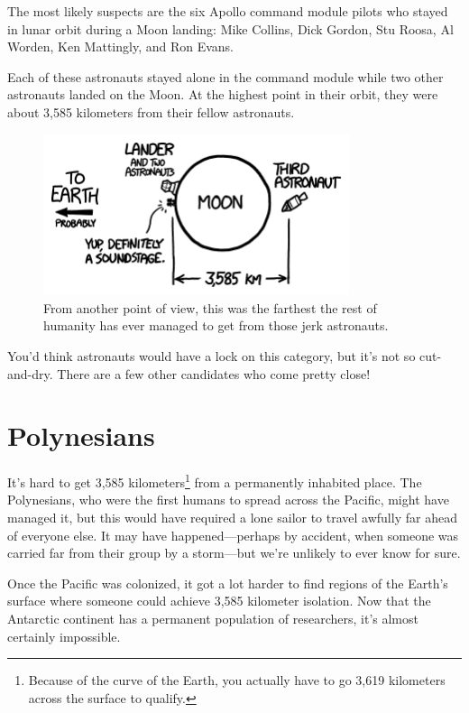 {{The most likely suspects are the six Apollo command module pilots who stayed in lunar orbit during a Moon landing: Mike Collins, Dick Gordon, Stu Roosa, Al Worden, Ken Mattingly, and Ron Evans.}

{Each of these astronauts stayed alone in the command module while two other astronauts landed on the Moon. At the highest point in their orbit, they were about 3,585 kilometers from their fellow astronauts.}

\begin{figure}[!htbp]
\centering
\includegraphics[scale=0.5, max width=0.8\textwidth]{imgs/a/72/lonely_apollo.png}
\caption{From another point of view, this was the farthest the rest of humanity has ever managed to get from those jerk astronauts.}
\end{figure}

{You'd think astronauts would have a lock on this category, but it's not so cut-and-dry. There are a few other candidates who come pretty close!}

\section*{Polynesians}

{It's hard to get 3,585 kilometers{\footnote{Because of the curve of the Earth, you actually have to go 3,619 kilometers across the surface to qualify.} } from a permanently inhabited place. The Polynesians, who were the first humans to spread across the Pacific, might have managed it, but this would have required a lone sailor to travel awfully far ahead of everyone else. It may have happened—perhaps by accident, when someone was carried far from their group by a storm—but we're unlikely to ever know for sure.}

{Once the Pacific was colonized, it got a lot harder to find regions of the Earth's surface where someone could achieve 3,585 kilometer isolation. Now that the Antarctic continent has a permanent population of researchers, it's almost certainly impossible.}

}
